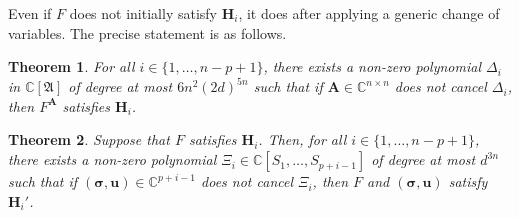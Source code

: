 \documentclass[a4paper]{article}
\def\A{\mathfrak{A}}
\def\mA{{\bm A}}
\def\ub{{\bm u}}
\def\D{\Delta}
\def\C{\mathbb{C}}
\newtheorem{theorem}{Theorem}[section]
\begin{document}
\noindent
Even if $F$ does not initially satisfy $\textbf{H}_i$, it does after applying a generic change of variables. The precise
statement is as follows.  
%
\begin{theorem}\label{theo:gen}
  For all $i\in\{1,\dots,n-p+1\}$, there exists a non-zero polynomial $\D_i$ in
  $\C[\A]$ of degree at most $6n^2(2d)^{5n}$ such that if $\mA \in
  \C^{n\times n}$ does not cancel $\D_i$, then
  $F^\mA$ satisfies $\textbf{H}_i$.
\end{theorem}
%
\begin{theorem}\label{theo:Hp}
  Suppose that $F$ satisfies $\textbf{H}_i$. Then, for all $i\in\{1,\dots,n-p+1\}$, there exists a non-zero
  polynomial $\Xi_{i} \in \C[S_1,\dots,S_{p+i-1}]$ of degree at most
  $d^{3n}$ such that if $(\bm \sigma,\ub) \in \C^{p+i-1}$ does not
  cancel $\Xi_{i}$, then $F$ and $(\bm \sigma,\ub)$ satisfy $\textbf{H}_i'$.
\end{theorem}



\end{document}
